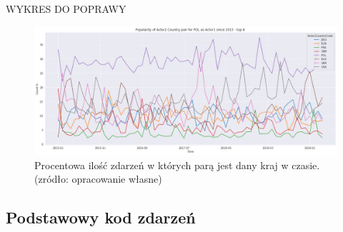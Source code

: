 \documentclass[11pt]{report}
\begin{document}
	   WYKRES DO POPRAWY
	\begin{figure}[ht]
	\centering
	\includegraphics[width=0.8 \textwidth]{fig/PL/PLactor2PairPercinTIME.png}
	\caption{Procentowa ilość zdarzeń w których parą jest dany kraj w czasie. (zródło: opracowanie własne)}
	\label{fig:PLpairPerc}
	\end{figure}
	
 \subsection{Podstawowy kod zdarzeń}
 	
\end{document}
